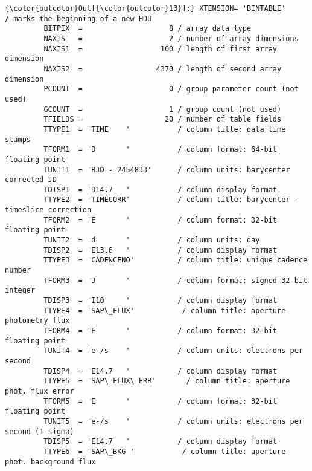 \documentclass[11pt]{article}
\begin{document}
\begin{Verbatim}[commandchars=\\\{\}]
{\color{outcolor}Out[{\color{outcolor}13}]:} XTENSION= 'BINTABLE'           / marks the beginning of a new HDU               
         BITPIX  =                    8 / array data type                                
         NAXIS   =                    2 / number of array dimensions                     
         NAXIS1  =                  100 / length of first array dimension                
         NAXIS2  =                 4370 / length of second array dimension               
         PCOUNT  =                    0 / group parameter count (not used)               
         GCOUNT  =                    1 / group count (not used)                         
         TFIELDS =                   20 / number of table fields                         
         TTYPE1  = 'TIME    '           / column title: data time stamps                 
         TFORM1  = 'D       '           / column format: 64-bit floating point           
         TUNIT1  = 'BJD - 2454833'      / column units: barycenter corrected JD          
         TDISP1  = 'D14.7   '           / column display format                          
         TTYPE2  = 'TIMECORR'           / column title: barycenter - timeslice correction
         TFORM2  = 'E       '           / column format: 32-bit floating point           
         TUNIT2  = 'd       '           / column units: day                              
         TDISP2  = 'E13.6   '           / column display format                          
         TTYPE3  = 'CADENCENO'          / column title: unique cadence number            
         TFORM3  = 'J       '           / column format: signed 32-bit integer           
         TDISP3  = 'I10     '           / column display format                          
         TTYPE4  = 'SAP\_FLUX'           / column title: aperture photometry flux         
         TFORM4  = 'E       '           / column format: 32-bit floating point           
         TUNIT4  = 'e-/s    '           / column units: electrons per second             
         TDISP4  = 'E14.7   '           / column display format                          
         TTYPE5  = 'SAP\_FLUX\_ERR'       / column title: aperture phot. flux error        
         TFORM5  = 'E       '           / column format: 32-bit floating point           
         TUNIT5  = 'e-/s    '           / column units: electrons per second (1-sigma)   
         TDISP5  = 'E14.7   '           / column display format                          
         TTYPE6  = 'SAP\_BKG '           / column title: aperture phot. background flux   

\end{Verbatim}
\end{document}
